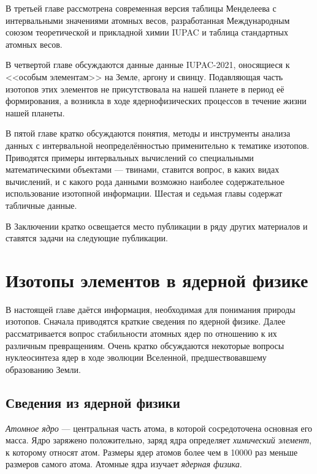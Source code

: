 \documentclass[a5paper,openany]{book}
\begin{document}
	В третьей главе
	рассмотрена современная версия таблицы Менделеева с интервальными значениями атомных весов, разработанная Международным союзом теоретической и прикладной химии IUPAC и таблица стандартных атомных весов.
	
	В четвертой главе обсуждаются данные данные IUPAC-2021, оносящиеся к <<особым элементам>> на Земле, аргону и свинцу. Подавляющая часть изотопов этих элементов не присутствовала на нашей планете в период её формирования, а возникла в ходе ядернофизических процессов в течение жизни нашей планеты.
	
	В пятой главе кратко обсуждаются понятия, методы и инструменты анализа данных с интервальной неопределённостью применительно к тематике изотопов.	Приводятся примеры интервальных вычислений со специальными математическими объектами --- твинами, ставится вопрос, в каких видах вычислений, и с какого рода данными возможно наиболее содержательное использование изотопной информации.
	Шестая и седьмая главы содержат табличные данные. 
	
	В Заключении кратко освещается место публикации в ряду других материалов и ставятся задачи на следующие публикации. 
	
	\chapter{Изотопы элементов в ядерной физике} \label{IsotopesNature}
	
	
	
	В настоящей главе даётся информация, необходимая для понимания природы изотопов.
	Сначала приводятся краткие сведения по ядерной физике.
	Далее рассматривается вопрос стабильности атомных ядер по отношению к их различным превращениям.
	Очень кратко обсуждаются некоторые вопросы нуклеосинтеза ядер в ходе эволюции Вселенной, предшествовавшему образованию Земли.
	
	
	\section{Сведения из ядерной физики} \label{s:NuclPhys}
	
	\emph{Атомное ядро}   --- центральная часть атома, в которой сосредоточена основная его масса. Ядро заряжено положительно, заряд ядра определяет  \emph{химический элемент}, к которому относят атом. Размеры ядер атомов более чем в 10000 раз меньше размеров самого атома. Атомные ядра изучает  \emph{ядерная физика}.
	
\end{document}

